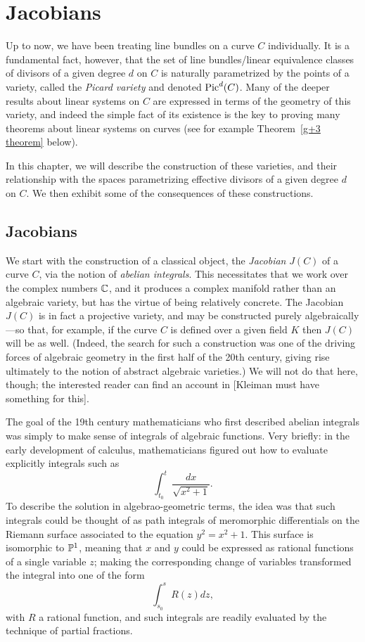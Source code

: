 

\chapter{Jacobians}


Up to now, we have been treating line bundles on a curve $C$ individually. It is a fundamental fact, however, that the set of line bundles/linear equivalence classes of divisors of a given degree $d$ on $C$ is naturally parametrized by the points of a variety, called the \emph{Picard variety} and denoted ${\rm Pic}^d(C)$. Many of the deeper results about linear systems on $C$ are expressed in terms of the geometry of this variety, and indeed the simple fact of its existence is the key to proving many theorems about linear systems on curves (see for example Theorem~\ref{g+3 theorem}
below).

In this chapter, we will describe the construction of these varieties, and their relationship with the spaces parametrizing effective divisors of a given degree $d$ on $C$. We then exhibit some of the consequences of these constructions.

\section{Jacobians}

We start with the construction of a classical object, the \emph{Jacobian} $J(C)$ of a curve $C$, via the notion of \emph{abelian integrals}. This necessitates that we work over the complex numbers $\CC$, and it produces a complex manifold rather than an algebraic variety, but has the virtue of being relatively concrete. The Jacobian $J(C)$ is in fact a projective variety, and may be constructed purely algebraically---so that, for example, if the curve $C$ is defined over a given field $K$ then $J(C)$ will be as well. (Indeed, the search for such a construction was one of the driving forces of algebraic geometry in the first half of the 20th century, giving rise ultimately to the notion of abstract algebraic varieties.) We will not do that here, though; the interested reader can find an account in \cite{??s} [Kleiman must have something for this].

The goal of the 19th century mathematicians who first described abelian integrals was simply to make sense of integrals of algebraic functions. Very briefly: in the early development of calculus, mathematicians figured out how to evaluate explicitly integrals such as
$$
\int_{t_0}^t \frac{dx}{\sqrt{x^2+1}}.
$$
To describe the solution in algebrao-geometric terms, the idea was that such integrals could be thought of as path integrals of meromorphic differentials on the Riemann surface associated to the equation $y^2 = x^2+1$. This surface is isomorphic to $\PP^1$, meaning that $x$ and $y$ could be expressed as rational functions of a single variable $z$; making the corresponding change of variables transformed the integral into one of the form
$$
\int_{s_0}^s R(z)dz,
$$
with $R$ a rational function, and such integrals are readily evaluated by the technique of partial fractions.

